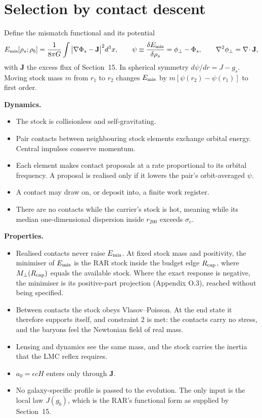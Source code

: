 \section{Selection by contact descent}

Define the mismatch functional and its potential
\begin{equation}
E_{\rm mis}[\rho_s;\rho_b]=\frac{1}{8\pi G}\int\big|\nabla\Phi_s-\mathbf J\big|^2d^3x,
\qquad
\psi\equiv\frac{\delta E_{\rm mis}}{\delta\rho_s}=\phi_\perp-\Phi_s,
\qquad \nabla^2\phi_\perp=\nabla\!\cdot\mathbf J ,
\end{equation}
with $\mathbf J$ the excess flux of Section~15. In spherical symmetry $d\psi/dr=J-g_s$. Moving stock mass $m$ from $r_1$ to $r_2$ changes $E_{\rm mis}$ by $m[\psi(r_2)-\psi(r_1)]$ to first order.

\textbf{Dynamics.}
\begin{itemize}
\item The stock is collisionless and self-gravitating.
\item Pair contacts between neighbouring stock elements exchange orbital energy. Central impulses conserve momentum.
\item Each element makes contact proposals at a rate proportional to its orbital frequency. A proposal is realised only if it lowers the pair's orbit-averaged $\psi$.
\item A contact may draw on, or deposit into, a finite work register.
\item There are no contacts while the carrier's stock is hot, meaning while its median one-dimensional dispersion inside $r_{200}$ exceeds $\sigma_c$.
\end{itemize}

\textbf{Properties.}
\begin{itemize}
\item[(i)] Realised contacts never raise $E_{\rm mis}$. At fixed stock mass and positivity, the minimiser of $E_{\rm mis}$ is the RAR stock inside the budget edge $R_{\rm cap}$, where $M_\perp(R_{\rm cap})$ equals the available stock. Where the exact response is negative, the minimiser is its positive-part projection (Appendix O.3), reached without being specified.
\item[(ii)] Between contacts the stock obeys Vlasov--Poisson. At the end state it therefore supports itself, and constraint 2 is met: the contacts carry no stress, and the baryons feel the Newtonian field of real mass.
\item[(iii)] Lensing and dynamics see the same mass, and the stock carries the inertia that the LMC reflex requires.
\item[(iv)] $a_0=\epsilon cH$ enters only through $\mathbf J$.
\item[(v)] No galaxy-specific profile is passed to the evolution. The only input is the local law $J(g_b)$, which is the RAR's functional form as supplied by Section~15.
\end{itemize}

